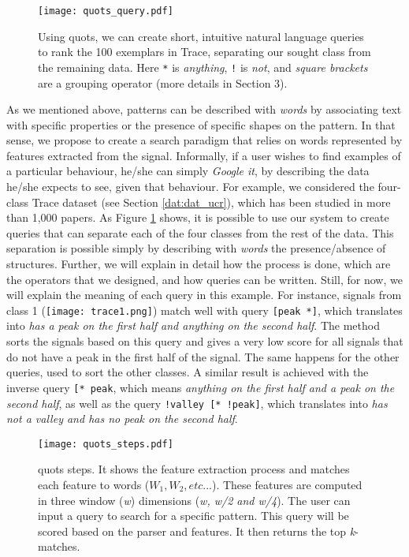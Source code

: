\begin{figure}
    \centering
    \texttt{[image: quots\_query.pdf]}
    \caption{Using \gls{quots}, we can create short, intuitive natural language queries to rank the 100 exemplars in Trace, separating our sought class from the remaining data. Here \texttt{*} is \textit{anything}, \texttt{!} is \textit{not}, and \textit{square brackets} are a grouping operator (more details in Section 3).}
    \label{fig:query_cold_start}
\end{figure}

As we mentioned above, patterns can be described with \textit{words} by associating text with specific properties or the presence of specific shapes on the pattern. In that sense, we propose to create a search paradigm that relies on words represented by features extracted from the signal. Informally, if a user wishes to find examples of a particular behaviour, he/she can simply \textit{Google it}, by describing the data he/she expects to see, given that behaviour. For example, we considered the four-class Trace dataset (see Section \ref{dat:dat_ucr}), which has been studied in more than 1,000 papers. As Figure \ref{fig:query_cold_start} shows, it is possible to use our system to create queries that can separate each of the four classes from the rest of the data. This separation is possible simply by describing with \textit{words} the presence/absence of structures. Further, we will explain in detail how the process is done, which are the operators that we designed, and how queries can be written. Still, for now, we will explain the meaning of each query in this example. For instance, signals from class 1 (\texttt{[image: trace1.png]}) match well with query \texttt{[peak *]}, which translates into \textit{has a peak on the first half and anything on the second half}. The method sorts the signals based on this query and gives a very low score for all signals that do not have a peak in the first half of the signal. The same happens for the other queries, used to sort the other classes. A similar result is achieved with the inverse query \texttt{[* peak}, which means \textit{anything on the first half and a peak on the second half}, as well as the query \texttt{!valley [* !peak]}, which translates into \textit{has not a valley and has no peak on the second half}.

\begin{figure}
\centering
\texttt{[image: quots\_steps.pdf]}
\caption{\gls{quots} steps. It shows the feature extraction process and matches each feature to words ($W_1, W_2, etc...$). These features are computed in three window (\textit{w}) dimensions (\textit{w, w/2 and w/4}). The user can input a query to search for a specific pattern. This query will be scored based on the parser and features. It then returns the top \textit{k}-matches.}
\label{fig:quots_steps}
\end{figure}

